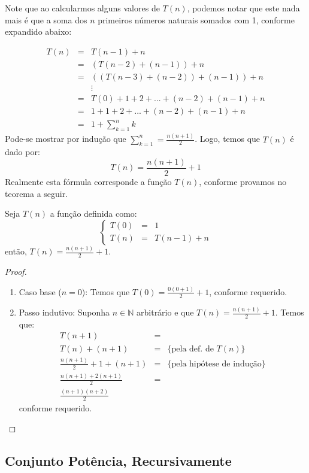 Note que ao calcularmos alguns valores de $T(n)$, podemos notar que
este nada mais é que a soma dos $n$ primeiros números naturais somados
com 1, conforme expandido abaixo:

\[
\begin{array}{lcl}
T(n) & = & T(n - 1) + n \\
       & = & (T(n - 2) + (n - 1)) + n\\
       & = & ( (T(n - 3) + (n - 2)) + (n - 1)) + n\\
       &  & \vdots\\
       & = & T(0) + 1 + 2 + ... + (n -2) + (n - 1) + n\\
       & = & 1 + 1 + 2 + ... + (n -2) + (n - 1) + n\\
       & = & 1 + \sum_{k = 1}^nk
\end{array}
\]
Pode-se mostrar por indução que $\sum_{k = 1}^n =
\frac{n(n+1)}{2}$. Logo, temos que $T(n)$ é dado por:
\[
T(n) = \frac{n(n+1)}{2} + 1
\]
Realmente esta fórmula corresponde a função $T(n)$, conforme provamos
no teorema a seguir.

\begin{Theorem}
Seja $T(n)$ a função definida como:
\[
\left\{
\begin{array}{lcl}
  T(0) & = & 1 \\
  T(n) & = & T(n - 1) + n
\end{array}
\right.
\]
então, $T(n) = \frac{n(n+1)}{2} + 1$.
\end{Theorem}
\begin{proof}
\begin{enumerate}
  \item[\ ]Caso base ($n = 0$): Temos que $T(0) = \frac{0(0 + 1)}{2} +
    1$, conforme requerido.
  \item[\ ]Passo indutivo: Suponha $n\in\mathbb{N}$ arbitrário e que
    $T(n) = \frac{n(n+1)}{2} + 1$. Temos que:
   \[
\begin{array}{lcl}
T(n + 1) & = \\
T(n) + (n + 1) & = & \{\text{pela def. de }T(n)\}\\
\frac{n(n+1)}{2} + 1 + (n + 1) & = & \{\text{pela hipótese de
  indução}\}\\
\frac{n(n + 1) + 2(n+1)}{2} & = & \\
\frac{(n + 1)(n + 2)}{2}
\end{array}
   \]
conforme requerido.
\end{enumerate}
\end{proof}

\subsection{Conjunto Potência, Recursivamente}

